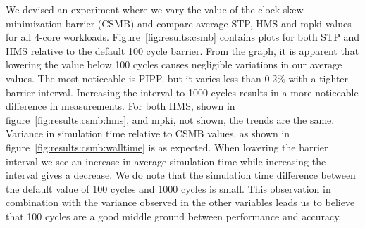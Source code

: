 We devised an experiment where we vary the value of the clock skew minimization barrier (CSMB) and compare average STP, HMS and mpki values for all 4-core workloads.
Figure~\ref{fig:results:csmb} contains plots for both STP and HMS relative to the default 100 cycle barrier.
From the graph, it is apparent that lowering the value below 100 cycles causes negligible variations in our average values. 
The most noticeable is PIPP, but it varies less than 0.2\% with a tighter barrier interval.
Increasing the interval to 1000 cycles results in a more noticeable difference in measurements.
For both HMS, shown in figure~\ref{fig:results:csmb:hms}, and mpki, not shown, the trends are the same.
Variance in simulation time relative to CSMB values, as shown in figure~\ref{fig:results:csmb:walltime} is as expected. 
When lowering the barrier interval we see an increase in average simulation time while increasing the interval gives a decrease.
We do note that the simulation time difference between the default value of 100 cycles and 1000 cycles is small.
This observation in combination with the variance observed in the other variables leads us to believe that 100 cycles are a good middle ground between performance and accuracy.

